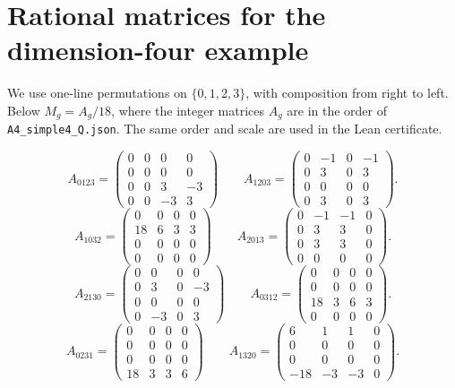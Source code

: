 \documentclass[11pt]{amsart}
\theoremstyle{definition}
\begin{document}
\appendix
\section{Rational matrices for the dimension-four example}
We use one-line permutations on $\{0,1,2,3\}$, with composition from right to left. Below $M_g=A_g/18$, where the integer matrices $A_g$ are in the order of \texttt{A4\_simple4\_Q.json}. The same order and scale are used in the Lean certificate.

\[
A_{0123}=\begin{pmatrix}0 & 0 & 0 & 0 \\ 0 & 0 & 0 & 0 \\ 0 & 0 & 3 & -3 \\ 0 & 0 & -3 & 3\end{pmatrix}\qquad A_{1203}=\begin{pmatrix}0 & -1 & 0 & -1 \\ 0 & 3 & 0 & 3 \\ 0 & 0 & 0 & 0 \\ 0 & 3 & 0 & 3\end{pmatrix}.
\]
\[
A_{1032}=\begin{pmatrix}0 & 0 & 0 & 0 \\ 18 & 6 & 3 & 3 \\ 0 & 0 & 0 & 0 \\ 0 & 0 & 0 & 0\end{pmatrix}\qquad A_{2013}=\begin{pmatrix}0 & -1 & -1 & 0 \\ 0 & 3 & 3 & 0 \\ 0 & 3 & 3 & 0 \\ 0 & 0 & 0 & 0\end{pmatrix}.
\]
\[
A_{2130}=\begin{pmatrix}0 & 0 & 0 & 0 \\ 0 & 3 & 0 & -3 \\ 0 & 0 & 0 & 0 \\ 0 & -3 & 0 & 3\end{pmatrix}\qquad A_{0312}=\begin{pmatrix}0 & 0 & 0 & 0 \\ 0 & 0 & 0 & 0 \\ 18 & 3 & 6 & 3 \\ 0 & 0 & 0 & 0\end{pmatrix}.
\]
\[
A_{0231}=\begin{pmatrix}0 & 0 & 0 & 0 \\ 0 & 0 & 0 & 0 \\ 0 & 0 & 0 & 0 \\ 18 & 3 & 3 & 6\end{pmatrix}\qquad A_{1320}=\begin{pmatrix}6 & 1 & 1 & 0 \\ 0 & 0 & 0 & 0 \\ 0 & 0 & 0 & 0 \\ -18 & -3 & -3 & 0\end{pmatrix}.
\]
\end{document}
